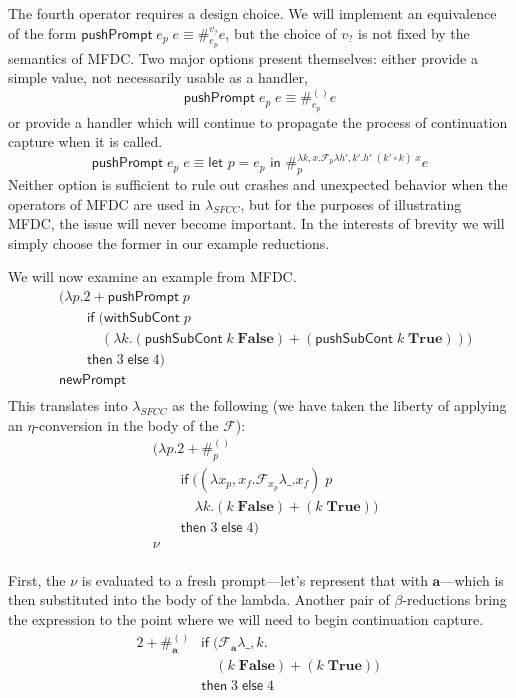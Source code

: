 \documentclass[11pt]{article}
\newcommand{\letin}[2]{\textsf{let }#1\textsf{ in }#2}
\newcommand\F{\mathcal{F}}
\begin{document}
The fourth operator requires a design choice.
We will implement an equivalence of the form $\mathsf{pushPrompt}\;e_p\;e \equiv \#_{e_p}^{v_?}e$, but the choice of $v_?$ is not fixed by the semantics of MFDC.
Two major options present themselves:
either provide a simple value, not necessarily usable as a handler,
$$\mathsf{pushPrompt}\;e_p\;e \equiv \#_{e_p}^{()}e$$
or provide a handler which will continue to propagate the process of continuation capture when it is called.
$$\mathsf{pushPrompt}\;e_p\;e \equiv
    \letin{p=e_p}\#_{p}^{\lambda k,x.\F_{p}\lambda h',k'.h'\;(k' \circ k)\;x}e$$
Neither option is sufficient to rule out crashes and unexpected behavior when the operators of MFDC are used in $\lambda_{SFCC}$, but for the purposes of illustrating MFDC, the issue will never become important.
In the interests of brevity we will simply choose the former in our example reductions.

We will now examine an example from MFDC.
\begin{align*}
&(\lambda p. 2 + \mathsf{pushPrompt}\;p \\
&\qquad \mathsf{if}\;(\mathsf{withSubCont}\;p \\
&\qquad\quad (\lambda k. (\mathsf{pushSubCont}\;k\;\mathbf{False}) +
            (\mathsf{pushSubCont}\;k\;\mathbf{True}))) \\
&\qquad \mathsf{then}\;3\;\mathsf{else}\;4) \\
&\mathsf{newPrompt} \\
\end{align*}
This translates into $\lambda_{SFCC}$ as the following (we have taken the liberty of applying an $\eta$-conversion in the body of the $\F$):
\begin{align*}
&(\lambda p. 2 + \#_p^{()} \\
&\qquad \mathsf{if}\;((\lambda x_p,x_f. \F_{x_p}\lambda \_.x_f)\;p \\
&\qquad\quad \lambda k. (k\;\mathbf{False}) +
            (k\;\mathbf{True})) \\
&\qquad \mathsf{then}\;3\;\mathsf{else}\;4) \\
&\nu \\
\end{align*}

First, the $\nu$ is evaluated to a fresh prompt---let's represent that with $\mathbf{a}$---which is then substituted into the body of the lambda.
Another pair of $\beta$-reductions bring the expression to the point where we will need to begin continuation capture.
\begin{align*}
2 + \#_\mathbf{a}^{()} &\mathsf{if}\;(\F_\mathbf{a}\lambda \_,k. \\
&\quad (k\;\mathbf{False}) + (k\;\mathbf{True}))\; \\
&\mathsf{then}\;3\;\mathsf{else}\;4 \\
\end{align*}
\end{document}
